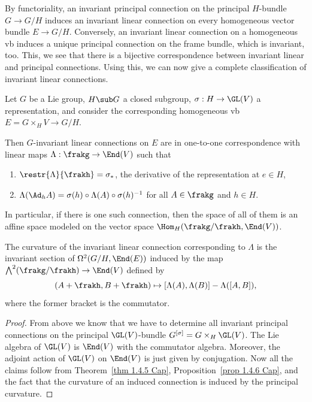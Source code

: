 By functoriality, an invariant principal connection on the principal $H$-bundle $G\to G\slash H$ induces an invariant linear connection on every homogeneous vector bundle $E\to G\slash H$. Conversely, an invariant linear connection on a homogeneous \gls{vb} induces a unique principal connection on the frame bundle, which is invariant, too. This, we see that there is a bijective correspondence between invariant linear and principal connections. Using this, we can now give a complete classification of invariant linear connections.

\begin{thm}\label{thm 1.4.7 Cap}
    Let $G$ be a Lie group, $H\sub G$ a closed subgroup, $\sigma:H\to \GL(V)$ a representation, and consider the corresponding homogeneous \gls{vb} $E=G\times_H V\to G\slash H$.

    Then $G$-invariant linear connections on $E$ are in one-to-one correspondence with linear maps $\Lambda:\frakg\to \End(V)$ such that 
    \begin{enumerate}[label=(\roman*)]
        \item $\restr{\Lambda}{\frakh}=\sigma_\ast$, the derivative of the representation at $e\in H$,
        \item $\Lambda(\Ad_h A)=\sigma(h)\circ\Lambda(A)\circ \sigma(h)^{-1}$ for all $A\in\frakg$ and $h\in H$.
    \end{enumerate}
    In particular, if there is one such connection, then the space of all of them is an affine space modeled on the vector space $\Hom_H(\frakg\slash\frakh,\End(V))$.

    The curvature of the invariant linear connection corresponding to $\Lambda$ is the invariant section of $\Omega^2(G\slash H,\End(E))$ induced by the map $\bigwedge^2(\frakg\slash\frakh)\to \End(V)$ defined by 
    \[(A+\frakh,B+\frakh)\mapsto [\Lambda(A),\Lambda(B)]-\Lambda([A,B]),\]
    where the former bracket is the commutator.
\end{thm}
\begin{proof}
    From above we know that we have to determine all invariant principal connections on the principal $\GL(V)$-bundle $G^{[\sigma]}=G\times_H \GL(V)$. The Lie algebra of $\GL(V)$ is $\End(V)$ with the commutator algebra. Moreover, the adjoint action of $\GL(V)$ on $\End(V)$ is just given by conjugation. Now all the claims follow from Theorem~\ref{thm 1.4.5 Cap}, Proposition~\ref{prop 1.4.6 Cap}, and the fact that the curvature of an induced connection is induced by the principal curvature.
\end{proof}


